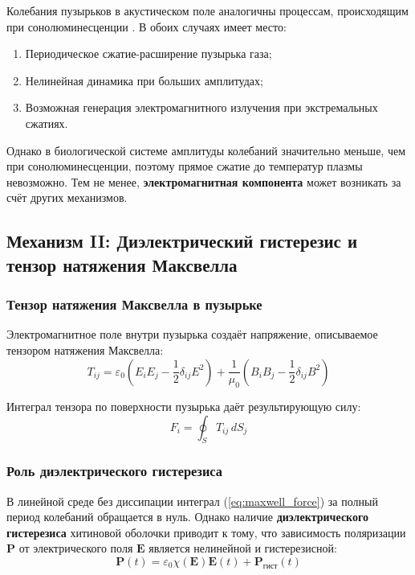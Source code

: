 \documentclass[12pt,a4paper]{article}
\begin{document}
Колебания пузырьков в акустическом поле аналогичны процессам, происходящим при сонолюминесценции \cite{sonoluminescence}. В обоих случаях имеет место:
\begin{enumerate}
    \item Периодическое сжатие-расширение пузырька газа;
    \item Нелинейная динамика при больших амплитудах;
    \item Возможная генерация электромагнитного излучения при экстремальных сжатиях.
\end{enumerate}

Однако в биологической системе амплитуды колебаний значительно меньше, чем при сонолюминесценции, поэтому прямое сжатие до температур плазмы невозможно. Тем не менее, \textbf{электромагнитная компонента} может возникать за счёт других механизмов.

\subsection{Механизм II: Диэлектрический гистерезис и тензор натяжения Максвелла}

\subsubsection{Тензор натяжения Максвелла в пузырьке}

Электромагнитное поле внутри пузырька создаёт напряжение, описываемое тензором натяжения Максвелла:
\begin{equation}
    T_{ij} = \varepsilon_0 \left( E_i E_j - \frac{1}{2} \delta_{ij} E^2 \right) + \frac{1}{\mu_0} \left( B_i B_j - \frac{1}{2} \delta_{ij} B^2 \right)
    \label{eq:maxwell_tensor}
\end{equation}

Интеграл тензора по поверхности пузырька даёт результирующую силу:
\begin{equation}
    F_i = \oint_S T_{ij} \, dS_j
    \label{eq:maxwell_force}
\end{equation}

\subsubsection{Роль диэлектрического гистерезиса}

В линейной среде без диссипации интеграл (\ref{eq:maxwell_force}) за полный период колебаний обращается в нуль. Однако наличие \textbf{диэлектрического гистерезиса} хитиновой оболочки приводит к тому, что зависимость поляризации $\bm{P}$ от электрического поля $\bm{E}$ является нелинейной и гистерезисной:
\begin{equation}
    \bm{P}(t) = \varepsilon_0 \chi(\bm{E}) \bm{E}(t) + \bm{P}_{\text{гист}}(t)
    \label{eq:hysteresis}
\end{equation}
\end{document}
